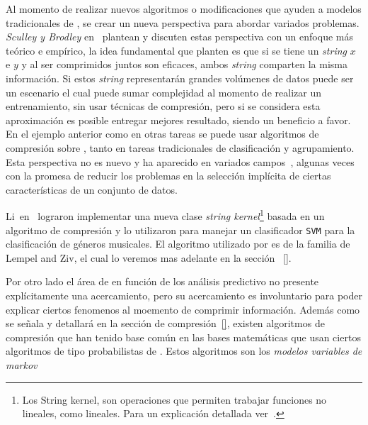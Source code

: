 Al momento de realizar nuevos algoritmos o modificaciones que ayuden a modelos tradicionales de \machinelearning, se crear un nueva perspectiva para abordar variados problemas. \emph{Sculley y Brodley} en~\cite{Sculley2006} plantean y discuten estas perspectiva con un enfoque más teórico e empírico, la idea fundamental que planten es que si se tiene un \emph{string} $x$ e $y$ y al ser comprimidos juntos son eficaces, ambos \emph{string} comparten la misma información. Si estos \emph{string} representarán grandes volúmenes de datos puede ser un escenario el cual puede sumar complejidad al momento de realizar un entrenamiento, sin usar técnicas de compresión, pero si se considera esta aproximación es posible entregar mejores resultado, siendo un beneficio a favor. En el ejemplo anterior como en otras tareas se puede usar algoritmos de compresión sobre \machinelearning, tanto en tareas tradicionales de clasificación y agrupamiento.  Esta perspectiva no es nuevo y ha aparecido en variados campos~\cite{Sculley2006}, algunas veces con la promesa de reducir los problemas en la selección implícita de ciertas características de un conjunto de datos. 

Li~\etal en~\cite{Li2005} lograron implementar una nueva clase \emph{string kernel}\footnote{Los String kernel, son operaciones que permiten trabajar funciones no lineales, como lineales. Para un explicación detallada ver~\cite{Li2005}.} basada en un algoritmo de compresión y lo utilizaron para manejar un clasificador \texttt{SVM} para la clasificación de géneros musicales. El algoritmo utilizado por \cite{Sculley2006} es de la familia de {Lempel and Ziv}, el cual lo veremos mas adelante en la sección ~\ref{}.







Por otro lado el área de \losslessdatacompression en función de los análisis predictivo no presente explícitamente una acercamiento, pero su acercamiento es involuntario para poder explicar ciertos fenomenos al moemento de comprimir información.  Además como se señala y detallará en la sección de compresión~\ref{}, existen algoritmos de compresión que han tenido base común en las bases matemáticas que usan ciertos algoritmos de tipo probabilistas de \machinelearning. Estos algoritmos son los \emph{modelos variables de markov}














